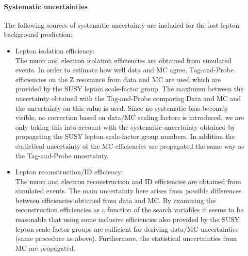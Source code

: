 
\paragraph{Systematic uncertainties}

The following sources of systematic uncertainty are included for the lost-lepton background prediction:

\begin{itemize}
\item Lepton isolation efficiency:\\
  The muon and electron isolation efficiencies are obtained from simulated events. In order to estimate how well data and MC agree, Tag-and-Probe efficiencies on the Z resonance from data and MC are used which are provided by the SUSY lepton scale-factor group. The maximum between the uncertainty obtained with the Tag-and-Probe comparing Data and MC and the uncertainty on this value is used. %
  Since no systematic bias becomes visible,
  no correction based on data/MC scaling factors is introduced, we are only taking this into account with the systematic uncertainty obtained by propagating the SUSY lepton scale-factor group numbers.
  In addition the statistical uncertainty of the MC efficiencies are
  propagated the same way as the Tag-and-Probe uncertainty.
  \item Lepton reconstruction/ID efficiency:\\
  The muon and electron reconstruction and ID efficiencies are obtained from simulated events. The main uncertainty here arises
  from possible differences between efficiencies obtained from data and MC. By examining the reconstruction efficiencies as a function of the search variables it seems to be reasonable that using some inclusive efficiencies also provided by the SUSY lepton scale-factor groups are sufficient for deriving data/MC uncertainties (same procedure as above). Furthermore, the statistical uncertainties from MC are propagated.

\end{itemize}
